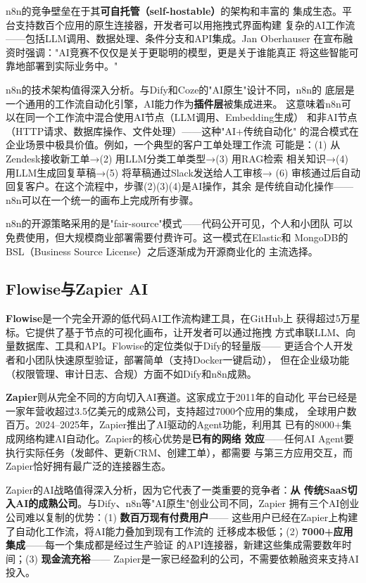 n8n的竞争壁垒在于其\textbf{可自托管（self-hostable）}的架构和丰富的
集成生态。平台支持数百个应用的原生连接器，开发者可以用拖拽式界面构建
复杂的AI工作流——包括LLM调用、数据处理、条件分支和API集成。Jan Oberhauser
在宣布融资时强调："AI竞赛不仅仅是关于更聪明的模型，更是关于谁能真正
将这些智能可靠地部署到实际业务中。"

n8n的技术架构值得深入分析。与Dify和Coze的"AI原生"设计不同，n8n的
底层是一个通用的工作流自动化引擎，AI能力作为\textbf{插件层}被集成进来。
这意味着n8n可以在同一个工作流中混合使用AI节点（LLM调用、Embedding生成）
和非AI节点（HTTP请求、数据库操作、文件处理）——这种"AI+传统自动化"
的混合模式在企业场景中极具价值。例如，一个典型的客户工单处理工作流
可能是：(1) 从Zendesk接收新工单→(2) 用LLM分类工单类型→(3) 用RAG检索
相关知识→(4) 用LLM生成回复草稿→(5) 将草稿通过Slack发送给人工审核→
(6) 审核通过后自动回复客户。在这个流程中，步骤(2)(3)(4)是AI操作，其余
是传统自动化操作——n8n可以在一个统一的画布上完成所有步骤。

n8n的开源策略采用的是"fair-source"模式——代码公开可见，个人和小团队
可以免费使用，但大规模商业部署需要付费许可。这一模式在Elastic和
MongoDB的BSL（Business Source License）之后逐渐成为开源商业化的
主流选择。

\subsection{Flowise与Zapier AI}
\label{subsec:flowise-zapier}

\textbf{Flowise}是一个完全开源的低代码AI工作流构建工具，在GitHub上
获得超过5万星标。它提供了基于节点的可视化画布，让开发者可以通过拖拽
方式串联LLM、向量数据库、工具和API。Flowise的定位类似于Dify的轻量版——
更适合个人开发者和小团队快速原型验证，部署简单（支持Docker一键启动），
但在企业级功能（权限管理、审计日志、合规）方面不如Dify和n8n成熟。

\textbf{Zapier}则从完全不同的方向切入AI赛道。这家成立于2011年的自动化
平台已经是一家年营收超过3.5亿美元的成熟公司，支持超过7000个应用的集成，
全球用户数百万。2024--2025年，Zapier推出了AI驱动的Agent功能，利用其
已有的8000+集成网络构建AI自动化。Zapier的核心优势是\textbf{已有的网络
效应}——任何AI Agent要执行实际任务（发邮件、更新CRM、创建工单），都需要
与第三方应用交互，而Zapier恰好拥有最广泛的连接器生态。

Zapier的AI战略值得深入分析，因为它代表了一类重要的竞争者：\textbf{从
传统SaaS切入AI的成熟公司}。与Dify、n8n等"AI原生"创业公司不同，Zapier
拥有三个AI创业公司难以复制的优势：(1) \textbf{数百万现有付费用户}——
这些用户已经在Zapier上构建了自动化工作流，将AI能力叠加到现有工作流的
迁移成本极低；(2) \textbf{7000+应用集成}——每一个集成都是经过生产验证
的API连接器，新建这些集成需要数年时间；(3) \textbf{现金流充裕}——
Zapier是一家已经盈利的公司，不需要依赖融资来支持AI投入。

